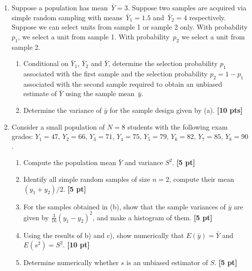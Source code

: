 \documentclass[12pt]{article}
\def\given{\, | \,}
\begin{document}
\begin{enumerate}
\begin{enumerate}
		\item Show that $E (X) = E(E(X \given C) )$ and $V(X) = V(E(X \given C)) + E(V(X \given C))$ {\bf [10 pt]}

		\end{enumerate}

\item Suppose a population has mean~$\bar Y = 3$. Suppose two samples are acquired via simple random sampling with means~$\bar Y_1 = 1.5$ and~$\bar Y_2 = 4$ respectively.  Suppose we can select units from sample 1 or sample 2 only.  With probability $p_1$, we select a unit from sample 1.  With probability~$p_2$ we select a unit from sample 2.

	\begin{enumerate}
		\item Conditional on $\bar Y_1$, $\bar Y_2$ and $\bar Y$, determine the selection probability $p_1$ associated with the first sample and the selection probability $p_2 = 1-p_1$ associated with the second sample required to obtain an unbiased estimate of $\bar Y$ using the sample mean~$\bar y$.
		\item Determine the variance of $\bar y$ for the sample design given by (a). {\bf [10 pts]}
	\end{enumerate}

\item Consider a small population of $N = 8$ students with the following exam grades: $Y_1 = 47$, $Y_2 = 66$, $Y_3 = 71$, $Y_4 = 75$, $Y_5 = 79$, $Y_6 = 82$, $Y_7 = 85$, $Y_8 = 90$.

	\begin{enumerate}
		\setlength{\itemsep}{15pt}%
		\setlength{\parskip}{15pt}%

		\item Compute the population mean $\bar Y$ and variance $S^2$. {\bf [5 pt]}
		\item Identify all simple random samples of size $n=2$, compute their mean $(y_1 + y_2)/2$. {\bf [5 pt]}
		\item For the samples obtained in (b), show that the sample variances of $\bar y$ are given by $\frac{3}{16} (y_1 - y_2)^2$, and make a histogram of them. {\bf [5 pt]}
		\item Using the results of b) and c), show numerically that $E(\bar y) = \bar Y$ and $E (s^2) = S^2$. {\bf [10 pt]}
		\item Determine numerically whether $s$ is an unbiased estimator of $S$. {\bf [5 pt]}
	\end{enumerate}


\end{enumerate}
\end{document}
